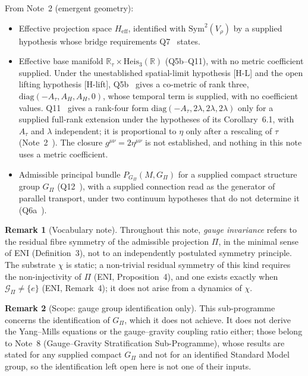 \documentclass[11pt,a4paper]{article}
\theoremstyle{definition}
\newtheorem{remark}{Remark}
\newcommand{\Heis}{\mathrm{Heis}}
\newcommand{\Gpi}{G_{\Pi}}
\newcommand{\Sym}{\mathrm{Sym}}
\begin{document}
    From Note~2 (emergent geometry):
    \begin{itemize}
      \item Effective projection space $H_{\mathrm{eff}}$, identified with $\Sym^2(V_\rho)$ by a
      supplied hypothesis whose bridge requirements Q7~\cite{Beau2026q7} states.
      \item Effective base manifold $\mathbb{R}_\tau \times \Heis_3(\mathbb{R})$ (Q5b--Q11),
      with no metric coefficient supplied.
      Under the unestablished spatial-limit hypothesis [H-L] and the open lifting hypothesis
      [H-lift], Q5b~\cite{Beau2026q5b} gives a co-metric of rank three,
      $\mathrm{diag}(-A_\tau, A_H, A_H, 0)$, whose temporal term is supplied, with no coefficient
      values.
      Q11~\cite{Beau2026q11} gives a rank-four form $\mathrm{diag}(-A_\tau, 2\lambda, 2\lambda,
      2\lambda)$ only for a supplied full-rank extension under the hypotheses of its
      Corollary~6.1, with $A_\tau$ and $\lambda$ independent; it is proportional to $\eta$ only
      after a rescaling of $\tau$ (Note~2~\cite{Beau2026egnote}).
      The closure $g^{\mu\nu} = 2\eta^{\mu\nu}$ is not established, and nothing in this note uses
      a metric coefficient.
      \item Admissible principal bundle $P_{\Gpi}(M, \Gpi)$ for a supplied compact structure
      group $\Gpi$ (Q12~\cite{Beau2026q12}), with a supplied connection read as the generator of
      parallel transport, under two continuum hypotheses that do not determine it
      (Q6a~\cite{Beau2026q6a}).
    \end{itemize}

    \begin{remark}[Vocabulary note]
Throughout this note, \emph{gauge invariance} refers to the residual fibre symmetry of the
admissible projection $\Pi$, in the minimal sense of ENI (Definition~3), not to an independently
postulated symmetry principle.
The substrate $\chi$ is static; a non-trivial residual symmetry of this kind requires the
non-injectivity of $\Pi$ (ENI, Proposition~4), and one exists exactly when
$\mathcal{G}_\Pi \neq \{e\}$ (ENI, Remark~4); it does not arise from a dynamics of $\chi$.
    \end{remark}

    \begin{remark}[Scope: gauge group identification only]
This sub-programme concerns the identification of $\Gpi$, which it does not achieve.
It does not derive the Yang--Mills equations or the gauge--gravity coupling ratio either; those
belong to Note~8 (Gauge--Gravity Stratification Sub-Programme), whose results are stated for any
supplied compact $\Gpi$ and not for an identified Standard Model group, so the identification left
open here is not one of their inputs.
    \end{remark}
\end{document}

